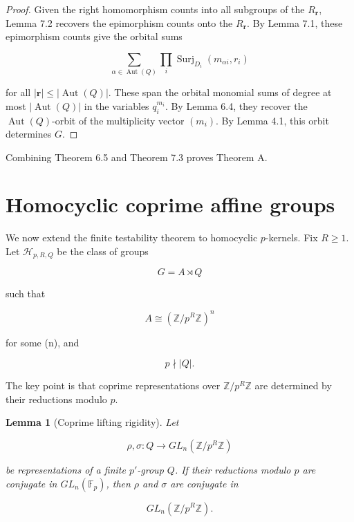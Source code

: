 \documentclass[11pt]{article}
\newtheorem{lemma}[theorem]{Lemma}
\begin{document}
\begin{proof}
Given the right homomorphism counts into all subgroups of the $R_{\mathbf r}$, Lemma 7.2 recovers the epimorphism counts onto the $R_{\mathbf r}$. By Lemma 7.1, these epimorphism counts give the orbital sums

\[
\sum_{\alpha\in\operatorname{Aut}(Q)}
\prod_i
\operatorname{Surj}_{D_i}(m_{\alpha i},r_i)
\]

for all $|\mathbf r|\le|\operatorname{Aut}(Q)|$. These span the orbital monomial sums of degree at most $|\operatorname{Aut}(Q)|$ in the variables $q_i^{m_i}$. By Lemma 6.4, they recover the $\operatorname{Aut}(Q)$-orbit of the multiplicity vector $(m_i)$. By Lemma 4.1, this orbit determines $G$.

\end{proof}

Combining Theorem 6.5 and Theorem 7.3 proves Theorem A.

\section{Homocyclic coprime affine groups}

We now extend the finite testability theorem to homocyclic $p$-kernels. Fix $R\ge1$. Let $\mathcal H_{p,R,Q}$ be the class of groups

\[
G=A\rtimes Q
\]

such that

\[
A\cong(\mathbb Z/p^R\mathbb Z)^n
\]

for some (n), and

\[
p\nmid |Q|.
\]

The key point is that coprime representations over $\mathbb Z/p^R\mathbb Z$ are determined by their reductions modulo $p$.

\begin{lemma}[Coprime lifting rigidity]
Let

\[
\rho,\sigma:Q\to GL_n(\mathbb Z/p^R\mathbb Z)
\]

be representations of a finite $p'$-group $Q$. If their reductions modulo $p$ are conjugate in $GL_n(\mathbb F_p)$, then $\rho$ and $\sigma$ are conjugate in

\[
GL_n(\mathbb Z/p^R\mathbb Z).
\]

\end{lemma}
\end{document}
